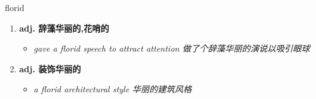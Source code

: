 
\begin{frame}
{\huge florid}
\begin{center}
\begin{enumerate}\Large
  \item \textbf{adj. 辞藻华丽的,花哨的}
  \begin{itemize}
    \item \em{\Large{gave a florid speech to attract attention 做了个辞藻华丽的演说以吸引眼球}}
  \end{itemize}
  \item \textbf{adj. 装饰华丽的}
  \begin{itemize}
    \item \em{\Large{a florid architectural style 华丽的建筑风格}}
  \end{itemize}
\end{enumerate}
\end{center}
\end{frame}
